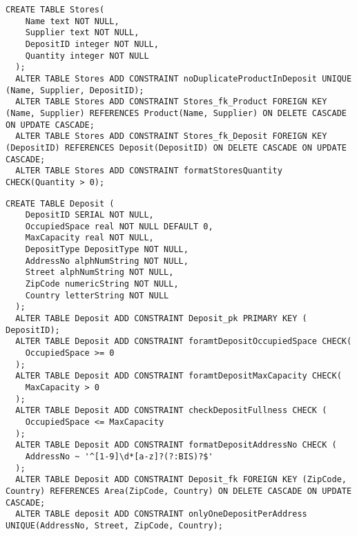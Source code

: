 \begin{lstlisting}[caption={Creazione della tabella \textbf{Stores}}]
  CREATE TABLE Stores(
    Name text NOT NULL,
    Supplier text NOT NULL,
    DepositID integer NOT NULL,
    Quantity integer NOT NULL
  );
  ALTER TABLE Stores ADD CONSTRAINT noDuplicateProductInDeposit UNIQUE (Name, Supplier, DepositID);
  ALTER TABLE Stores ADD CONSTRAINT Stores_fk_Product FOREIGN KEY (Name, Supplier) REFERENCES Product(Name, Supplier) ON DELETE CASCADE ON UPDATE CASCADE;
  ALTER TABLE Stores ADD CONSTRAINT Stores_fk_Deposit FOREIGN KEY (DepositID) REFERENCES Deposit(DepositID) ON DELETE CASCADE ON UPDATE CASCADE;
  ALTER TABLE Stores ADD CONSTRAINT formatStoresQuantity CHECK(Quantity > 0);
\end{lstlisting}

\newpage

\begin{lstlisting}[caption={Creazione della tabella \textbf{Deposit}}]
  CREATE TABLE Deposit (
    DepositID SERIAL NOT NULL,
    OccupiedSpace real NOT NULL DEFAULT 0,
    MaxCapacity real NOT NULL,
    DepositType DepositType NOT NULL,
    AddressNo alphNumString NOT NULL,
    Street alphNumString NOT NULL,
    ZipCode numericString NOT NULL,
    Country letterString NOT NULL
  );
  ALTER TABLE Deposit ADD CONSTRAINT Deposit_pk PRIMARY KEY ( DepositID);
  ALTER TABLE Deposit ADD CONSTRAINT foramtDepositOccupiedSpace CHECK(
    OccupiedSpace >= 0
  );
  ALTER TABLE Deposit ADD CONSTRAINT foramtDepositMaxCapacity CHECK(
    MaxCapacity > 0
  );
  ALTER TABLE Deposit ADD CONSTRAINT checkDepositFullness CHECK (
    OccupiedSpace <= MaxCapacity
  );
  ALTER TABLE Deposit ADD CONSTRAINT formatDepositAddressNo CHECK (
    AddressNo ~ '^[1-9]\d*[a-z]?(?:BIS)?$'
  );
  ALTER TABLE Deposit ADD CONSTRAINT Deposit_fk FOREIGN KEY (ZipCode, Country) REFERENCES Area(ZipCode, Country) ON DELETE CASCADE ON UPDATE CASCADE;
  ALTER TABLE deposit ADD CONSTRAINT onlyOneDepositPerAddress UNIQUE(AddressNo, Street, ZipCode, Country);
\end{lstlisting}

\newpage

